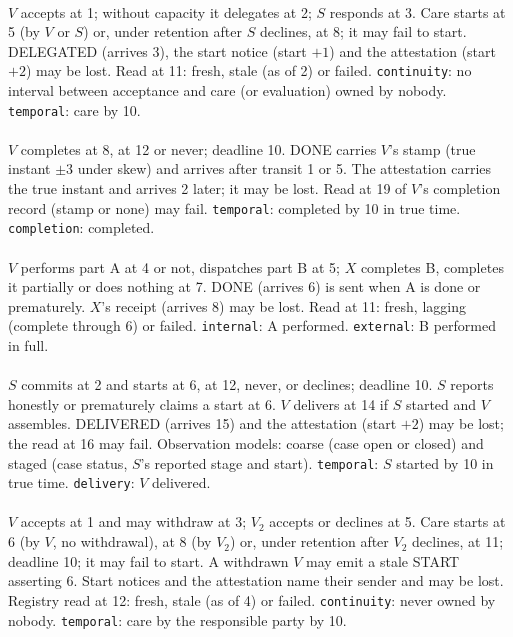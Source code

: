 \paragraph{} $V$ accepts at 1; without capacity it delegates at 2; $S$ responds at 3. Care starts at 5 (by $V$ or $S$) or, under retention after $S$ declines, at 8; it may fail to start. DELEGATED (arrives 3), the start notice (start $+1$) and the attestation (start $+2$) may be lost. Read at 11: fresh, stale (as of 2) or failed. \texttt{continuity}: no interval between acceptance and care (or evaluation) owned by nobody. \texttt{temporal}: care by 10.

\paragraph{} $V$ completes at 8, at 12 or never; deadline 10. DONE carries $V$'s stamp (true instant $\pm 3$ under skew) and arrives after transit 1 or 5. The attestation carries the true instant and arrives 2 later; it may be lost. Read at 19 of $V$'s completion record (stamp or none) may fail. \texttt{temporal}: completed by 10 in true time. \texttt{completion}: completed.

\paragraph{} $V$ performs part A at 4 or not, dispatches part B at 5; $X$ completes B, completes it partially or does nothing at 7. DONE (arrives 6) is sent when A is done or prematurely. $X$'s receipt (arrives 8) may be lost. Read at 11: fresh, lagging (complete through 6) or failed. \texttt{internal}: A performed. \texttt{external}: B performed in full.

\paragraph{} $S$ commits at 2 and starts at 6, at 12, never, or declines; deadline 10. $S$ reports honestly or prematurely claims a start at 6. $V$ delivers at 14 if $S$ started and $V$ assembles. DELIVERED (arrives 15) and the attestation (start $+2$) may be lost; the read at 16 may fail. Observation models: coarse (case open or closed) and staged (case status, $S$'s reported stage and start). \texttt{temporal}: $S$ started by 10 in true time. \texttt{delivery}: $V$ delivered.

\paragraph{} $V$ accepts at 1 and may withdraw at 3; $V_2$ accepts or declines at 5. Care starts at 6 (by $V$, no withdrawal), at 8 (by $V_2$) or, under retention after $V_2$ declines, at 11; deadline 10; it may fail to start. A withdrawn $V$ may emit a stale START asserting 6. Start notices and the attestation name their sender and may be lost. Registry read at 12: fresh, stale (as of 4) or failed. \texttt{continuity}: never owned by nobody. \texttt{temporal}: care by the responsible party by 10.

